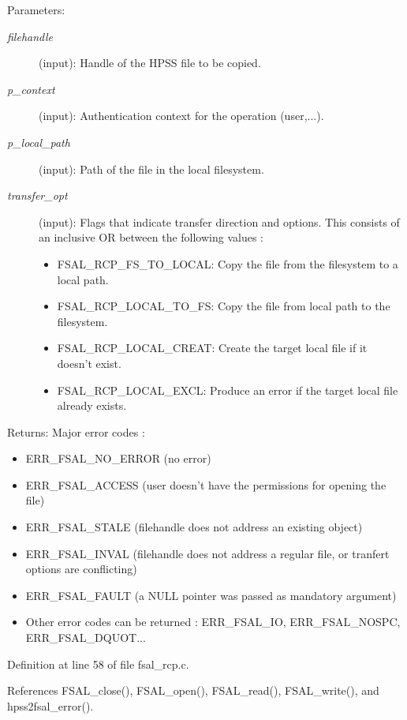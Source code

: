 \begin{Desc}
\item[Parameters:]
\begin{description}
\item[{\em filehandle}](input): Handle of the HPSS file to be copied. \item[{\em p\_\-context}](input): Authentication context for the operation (user,...). \item[{\em p\_\-local\_\-path}](input): Path of the file in the local filesystem. \item[{\em transfer\_\-opt}](input): Flags that indicate transfer direction and options. This consists of an inclusive OR between the following values :\begin{itemize}
\item FSAL\_\-RCP\_\-FS\_\-TO\_\-LOCAL: Copy the file from the filesystem to a local path.\item FSAL\_\-RCP\_\-LOCAL\_\-TO\_\-FS: Copy the file from local path to the filesystem.\item FSAL\_\-RCP\_\-LOCAL\_\-CREAT: Create the target local file if it doesn't exist.\item FSAL\_\-RCP\_\-LOCAL\_\-EXCL: Produce an error if the target local file already exists.\end{itemize}
\end{description}
\end{Desc}
\begin{Desc}
\item[Returns:]Major error codes :\begin{itemize}
\item ERR\_\-FSAL\_\-NO\_\-ERROR (no error)\item ERR\_\-FSAL\_\-ACCESS (user doesn't have the permissions for opening the file)\item ERR\_\-FSAL\_\-STALE (filehandle does not address an existing object)\item ERR\_\-FSAL\_\-INVAL (filehandle does not address a regular file, or tranfert options are conflicting)\item ERR\_\-FSAL\_\-FAULT (a NULL pointer was passed as mandatory argument)\item Other error codes can be returned : ERR\_\-FSAL\_\-IO, ERR\_\-FSAL\_\-NOSPC, ERR\_\-FSAL\_\-DQUOT... \end{itemize}
\end{Desc}


Definition at line 58 of file fsal\_\-rcp.c.

References FSAL\_\-close(), FSAL\_\-open(), FSAL\_\-read(), FSAL\_\-write(), and hpss2fsal\_\-error().